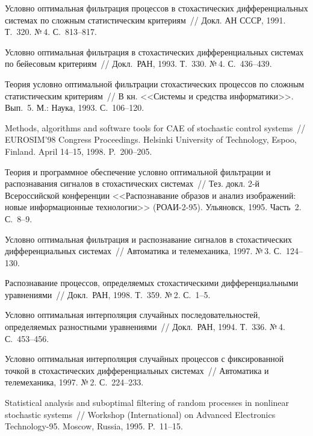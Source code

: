 \begin{multicols}{2}
{{\begin{thebibliography}{99}
Условно оптимальная фильтрация
процессов в стохастических дифференциальных системах по сложным
статистическим критериям~// Докл. АН СССР, 1991. Т.~320. №\,4.
С.~813--817.

 Условно оптимальная фильтрация в 
стохастических дифференциальных системах по бейесовым критериям~// Докл.\ РАН, 
1993. Т.~330. №\,4. С.~436--439.

Теория условно оптимальной фильтрации стохастических процессов по сложным
статистическим критериям~// В кн. <<Системы и средства
информатики>>. Вып.~5. М.: Наука, 1993.  С.~106--120.

Methods, algorithms and
software tools for CAE of stochastic control systems~//
 EUROSIM'98 Congress Proceedings. Helsinki University of
Technology, Espoo, Finland. April 14--15, 1998. P.~200--205.

Теория и программное обеспечение
условно оптимальной фильтрации и распознавания сигналов в
стохастических системах~// Тез. докл. 2-й Всероссийской конференции
<<Распознавание образов  и анализ изображений: новые информационные
технологии>> (РОАИ-2-95). Ульяновск, 1995. Часть~2. С.~8--9.

 Условно оптимальная фильтрация и распознавание
сигналов в стохастических дифференциальных системах~//
Автоматика и телемеханика, 1997. №\,3. С.~124--130.

Распознавание процессов,
определяемых стохастическими дифференциальными уравнениями~//
Докл.\ РАН, 1998. Т.~359. №\,2. С.~1--5.

Условно оптимальная интерполяция
случайных последовательностей, определяемых разностными
уравнениями~// Докл.\ РАН, 1994. Т.~336. №\,4. С.~453--456.

Условно оптимальная интерполяция случайных
процессов с фиксированной точкой в стохастических дифференциальных
сис\-те\-мах~//
Автоматика и телемеханика, 1997. №\,2. С.~224--233.

Statistical analysis and suboptimal
filtering of random processes in nonlinear stochastic systems~//
 Workshop (International) on Advanced Electronics Technology-95. Moscow,
Russia,  1995. P.~11--15.


\end{thebibliography}}}
\end{multicols}
